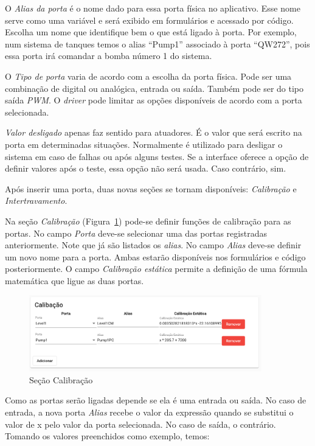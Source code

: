 O \textit{Alias da porta} é o nome dado para essa porta física no aplicativo.
Esse nome serve como uma variável e será exibido em formulários e acessado por
código. Escolha um nome que identifique bem o que está ligado à porta. Por
exemplo, num sistema de tanques temos o alias \enquote{Pump1} associado à porta
\enquote{QW272}, pois essa porta irá comandar a bomba número 1 do sistema.

O \textit{Tipo de porta} varia de acordo com a escolha da porta física. Pode ser
uma combinação de digital ou analógica, entrada ou saída. Também pode ser do
tipo saída \textit{PWM}. O \textit{driver} pode limitar as opções disponíveis de
acordo com a porta selecionada.

\textit{Valor desligado} apenas faz sentido para atuadores. É o valor que será
escrito na porta em determinadas situações. Normalmente é utilizado para
desligar o sistema em caso de falhas ou após alguns testes. Se a interface
oferece a opção de definir valores após o teste, essa opção não será usada. Caso
contrário, sim.

Após inserir uma porta, duas novas seções se tornam disponíveis:
\textit{Calibração} e \textit{Intertravamento}.

Na seção \textit{Calibração} (Figura~\ref{fig:hardware4}) pode-se definir funções
de calibração para as portas. No campo \textit{Porta} deve-se selecionar uma das
portas registradas anteriormente. Note que já são listados os \textit{alias}. No
campo \textit{Alias} deve-se definir um novo nome para a porta. Ambas estarão
disponíveis nos formulários e código posteriormente. O campo \textit{Calibração
estática} permite a definição de uma fórmula matemática que ligue as duas
portas.

\begin{figure}[ht!]
    \centering
    \includegraphics[width=0.9\textwidth]{imgs/hardware4}
    \caption[Seção Calibração]{Seção Calibração}%
    \label{fig:hardware4}
\end{figure}

Como as portas serão ligadas depende se ela é uma entrada ou saída. No caso de
entrada, a nova porta \textit{Alias} recebe o valor da expressão quando se
substitui o valor de x pelo valor da porta selecionada. No caso de saída, o
contrário. Tomando os valores preenchidos como exemplo, temos:

